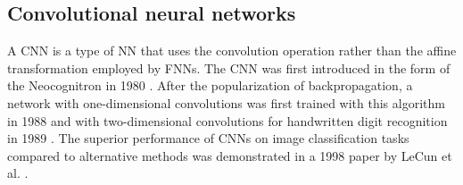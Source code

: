 \subsection{Convolutional neural networks}
A \Gls{CNN} is a type of \gls{NN} that uses the convolution operation rather than the affine transformation employed by \glspl{FNN}. The \gls{CNN} was first introduced in the form of the Neocognitron in 1980 \cite{Fukushima1980}. After the popularization of backpropagation, a network with one-dimensional convolutions was first trained with this algorithm in 1988 \cite{Hinton1988} and with two-dimensional convolutions for handwritten digit recognition in 1989 \cite{LeCun1989a}. The superior performance of \glspl{CNN} on image classification tasks compared to alternative methods was demonstrated in a 1998 paper by LeCun et al. \cite{LeCun1998}.

